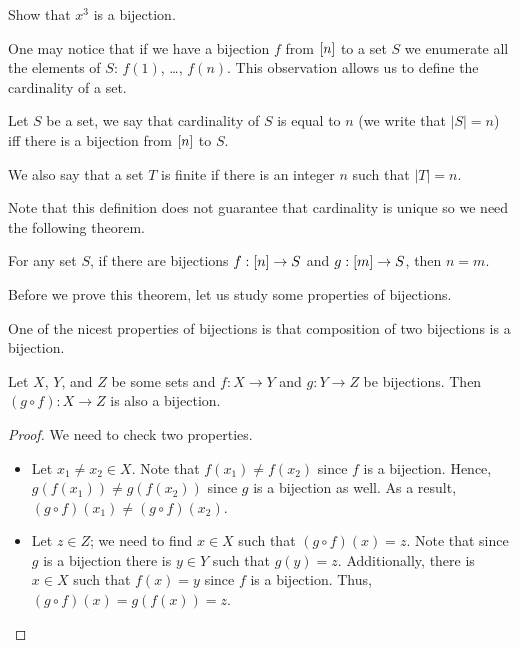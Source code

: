 \begin{exercise}
    Show that $x^3$ is a bijection.
\end{exercise}

One may notice that if we have a bijection $f$ from ${[{n}]}$ to a set $S$ we
enumerate all the elements of $S$: $f(1)$, \dots, $f(n)$.
This observation allows us to define the cardinality of a set.
\begin{definition}
    Let $S$ be a set, we say that cardinality of $S$ is equal to $n$ (we write
    that $|S| = n$) iff there is a bijection from ${[{n}]}$ to $S$.

    We also say that a set $T$ is finite if there is an integer $n$ such that
    $|T| = n$.
\end{definition}

Note that this definition does not guarantee that cardinality is unique so
we need the following theorem.
\begin{theorem}
\label{theorem:correctness-of-cardinality}
    For any set $S$, if there are bijections $f : {[{n}]} \to S$ and
    $g : {[{m}]} \to S$, then $n = m$.
\end{theorem}
Before we prove this theorem, let us study some properties of bijections.

One of the nicest properties of bijections is that composition of two bijections
is a bijection.
\begin{theorem}
\label{theorem:bijections-composition}
    Let $X$, $Y$, and $Z$ be some sets and $f : X \to Y$ and $g : Y \to Z$ be
    bijections. Then $(g \circ f) : X \to Z$ is also a bijection.
\end{theorem}
\begin{proof}
    We need to check two properties.
    \begin{itemize}
        \item Let $x_1 \neq x_2 \in X$. Note that $f(x_1) \neq f(x_2)$ since $f$
            is a bijection. Hence, $g(f(x_1)) \neq g(f(x_2))$ since $g$ is a bijection
            as well. As a result, $(g \circ f)(x_1) \neq (g \circ f)(x_2)$.
        \item Let $z \in Z$; we need to find $x \in X$ such that
            $(g \circ f)(x) = z$. Note that since $g$ is a bijection there is
            $y \in Y$ such that $g(y) = z$. Additionally, there is $x \in X$ such
            that $f(x) = y$ since $f$ is a bijection. Thus,
            $(g \circ f)(x) = g(f(x)) = z$.
    \end{itemize}
\end{proof}

